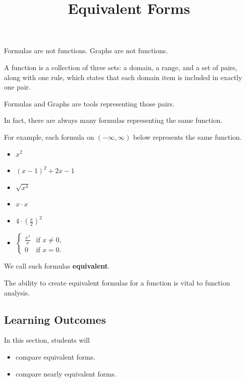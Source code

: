 \documentclass{ximera}
\title{Equivalent Forms}
\begin{document}
\begin{abstract}
\end{abstract}
\maketitle




Formulas are not functions.  Graphs are not functions. 


A function is a collection of three sets: a domain, a range, and a set of pairs, along with one rule, which states that each domain item is included in exactly one pair.

Formulas and Graphs are tools representing those pairs.  


In fact, there are always many formulas representing the same function.

For example, each formula on $(-\infty, \infty)$ below represents the same function.


\begin{itemize}
\item $x^2$
\item $(x - 1)^2 + 2 x - 1$
\item $\sqrt{x^4}$
\item $ x \cdot x$
\item $ 4 \cdot \left( \frac{x}{2} \right)^2$
\item $\begin{cases}
  \frac{x^3}{x} &\text{if $x \ne 0$,}\\
  0 &\text{if $x = 0$}.
\end{cases}$
\end{itemize}




We call such formulas \textbf{equivalent}.

The ability to create equivalent formulas for a function is vital to function analysis.




\subsection*{Learning Outcomes}


\begin{sectionOutcomes}
In this section, students will 

\begin{itemize}
\item compare equivalent forms.
\item compare nearly equivalent forms.
\end{itemize}
\end{sectionOutcomes}
\end{document}
